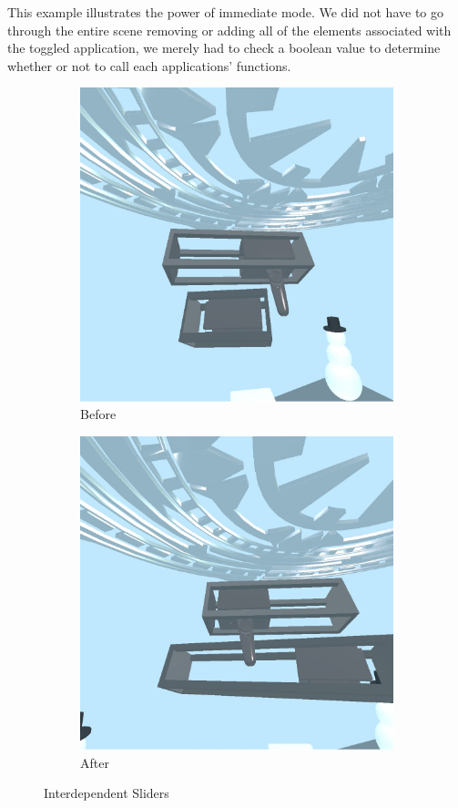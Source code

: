 \documentclass[conference,12pt]{IEEEtran}
\begin{document}
This example illustrates the power of immediate mode. We did not have to go
through the entire scene removing or adding all of the elements associated with
the toggled application, we merely had to check a boolean value to determine
whether or not to call each applications' functions.

\begin{figure}[H]
    \begin{subfigure}{\linewidth}
        \centering
        \includegraphics[width=0.8\linewidth]{screenshots/slider_a.jpg}
        \caption{Before}
    \end{subfigure}
    \begin{subfigure}{\linewidth}
        \centering
        \includegraphics[width=0.8\linewidth]{screenshots/slider_b.jpg}
        \caption{After}
    \end{subfigure}
    \caption{Interdependent Sliders}
    \label{fig:sliders}
\end{figure}
\end{document}
